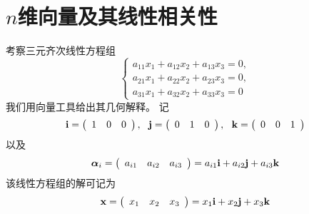 \section{$n$维向量及其线性相关性}

\begin{frame}
\begin{footnotesize}
  考察三元齐次线性方程组
  \begin{equation}\label{ls}
    \left\{
    \begin{array}{l}
      a_{11}x_1+a_{12}x_2+a_{13}x_3=0,\\[0.1in]
      a_{21}x_1+a_{22}x_2+a_{23}x_3=0,\\[0.1in]
      a_{31}x_1+a_{32}x_2+a_{33}x_3=0
    \end{array}
    \right.
  \end{equation}
  我们用向量工具给出其几何解释。
  \pause
  记
  $$
  \mathbf{i} = \left(
  \begin{array}{ccc}
    1&
    0&
    0
  \end{array}
  \right), ~~
  \mathbf{j} = \left(
  \begin{array}{ccc}
    0&
    1&
    0
  \end{array}
  \right), ~~
  \mathbf{k} = \left(
  \begin{array}{ccc}
    0&
    0&
    1
  \end{array}
  \right)
  $$
  以及
  $$
  \boldsymbol{\alpha}_i = \left(
  \begin{array}{ccc}
    a_{i1}&
    a_{i2}&
    a_{i3}
  \end{array}
  \right) = a_{i1} \mathbf{i} + a_{i2} \mathbf{j} + a_{i3} \mathbf{k}
  $$
  该线性方程组的解可记为
  $$
  \mathbf{x} = \left(
  \begin{array}{ccc}
    x_1&
    x_2&
    x_3
  \end{array}
  \right) = x_1\mathbf{i} + x_2\mathbf{j} + x_3\mathbf{k}
  $$
\end{footnotesize}
\end{frame}


